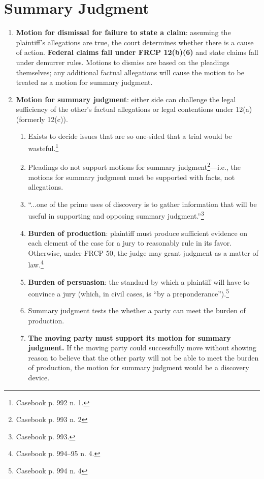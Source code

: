 \section{Summary Judgment}

\begin{enumerate}
    \item \textbf{Motion for dismissal for failure to state a claim}: assuming 
    the plaintiff's allegations are true, the court determines whether there 
    is a cause of action. \textbf{Federal claims fall under FRCP 12(b)(6)} and 
    state claims fall under demurrer rules. Motions to dismiss are based on 
    the pleadings themselves; any additional factual allegations will cause 
    the motion to be treated as a motion for summary judgment.
    \item \textbf{Motion for summary judgment}: either side can challenge the 
    legal sufficiency of the other's factual allegations or legal contentions 
    under 12(a) (formerly 12(c)).
    \begin{enumerate}
        \item Exists to decide issues that are so one-sided that a trial would 
        be wasteful.\footnote{Casebook p. 992 n. 1.}
        \item Pleadings do not support motions for summary 
        judgment\footnote{Casebook p. 993 n. 2}---i.e., the motions for 
        summary judgment must be supported with facts, not allegations.
        \item ``...one of the prime uses of discovery is to gather information 
        that will be useful in supporting and opposing summary 
        judgment.''\footnote{Casebook p. 993.}
        \item \textbf{Burden of production}: plaintiff must produce sufficient 
        evidence on each element of the case for a jury to reasonably rule in 
        its favor. Otherwise, under FRCP 50, the judge may grant judgment as a 
        matter of law.\footnote{Casebook p. 994--95 n. 4.}
        \item \textbf{Burden of persuasion}: the standard by which a plaintiff 
        will have to convince a jury (which, in civil cases, is ``by a 
        preponderance'').\footnote{Casebook p. 994 n. 4}
        \item Summary judgment tests the whether a party can meet the burden 
        of production.
        \item \textbf{The moving party must support its motion for summary 
        judgment.} If the moving party could successfully move without showing 
        reason to believe that the other party will not be able to meet the 
        burden of production, the motion for summary judgment would be a 
        discovery device.
    \end{enumerate}
\end{enumerate}

